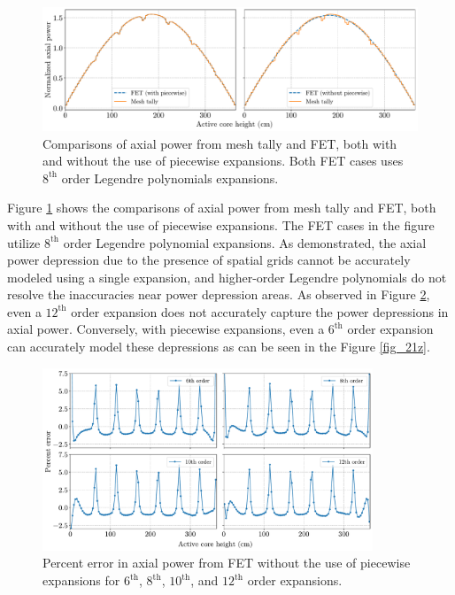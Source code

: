 \begin{figure}
    \centering
    \includegraphics[width=1.0\textwidth]{figs/axi_pow_comparison.pdf}
    \caption[Comparisons of axial power from mesh tally and FET.]{Comparisons of axial power from mesh tally and FET, both with and without the use of piecewise expansions. Both FET cases uses $8^\text{th}$ order Legendre polynomials expansions.}
    \label{fig_21x}
\end{figure}

Figure \ref{fig_21x} shows the comparisons of axial power from mesh tally and FET, both with and without the use of piecewise expansions. The FET cases in the figure utilize $8^\text{th}$ order Legendre polynomial expansions. As demonstrated, the axial power depression due to the presence of spatial grids cannot be accurately modeled using a single expansion, and higher-order Legendre polynomials do not resolve the inaccuracies near power depression areas. As observed in Figure \ref{fig_21y}, even a $12^\text{th}$ order expansion does not accurately capture the power depressions in axial power. Conversely, with piecewise expansions, even a $6^\text{th}$ order expansion can accurately model these depressions as can be seen in the Figure \ref{fig_21z}.

\begin{figure}
    \centering
    \includegraphics[width=0.88\textwidth]{figs/no_piecewise.pdf}
    \caption[Percent error in axial power from FET without the use of piecewise expansions.]{Percent error in axial power from FET without the use of piecewise expansions for $6^\text{th}$, $8^\text{th}$, $10^\text{th}$, and $12^\text{th}$ order expansions.}
    \label{fig_21y}
\end{figure}

